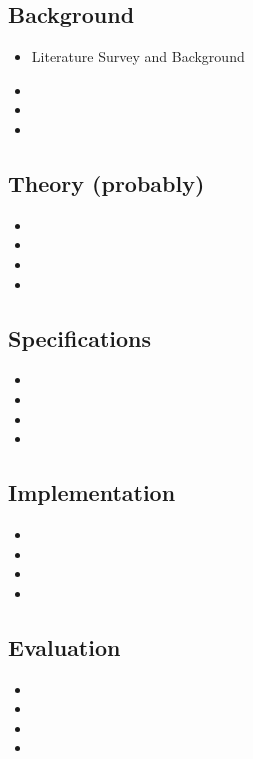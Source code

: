 \documentclass{article}
\begin{document}
\subsection{Background}
\begin{itemize}
	\item Literature Survey and Background
	\item 
	\item 
	\item 
\end{itemize}

\subsection{Theory (probably)}
\begin{itemize}
	\item 
	\item 
	\item 
	\item 
\end{itemize}

\subsection{Specifications}
\begin{itemize}
	\item 
	\item 
	\item 
	\item 
\end{itemize}

\subsection{Implementation}
\begin{itemize}
	\item 
	\item 
	\item 
	\item 
\end{itemize}

\subsection{Evaluation}
\begin{itemize}
	\item 
	\item 
	\item 
	\item 
\end{itemize}
\end{document}

